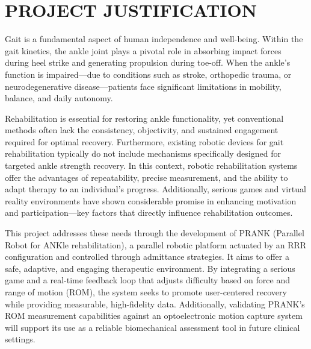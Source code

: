 \chapter{PROJECT JUSTIFICATION} \label{results}
\graphicspath{{images/}}

Gait is a fundamental aspect of human independence and well-being. Within the gait kinetics, the ankle joint plays a pivotal role in absorbing impact forces during heel strike and generating propulsion during toe-off. When the ankle's function is impaired—due to conditions such as stroke, orthopedic trauma, or neurodegenerative disease—patients face significant limitations in mobility, balance, and daily autonomy.

Rehabilitation is essential for restoring ankle functionality, yet conventional methods often lack the consistency, objectivity, and sustained engagement required for optimal recovery. Furthermore, existing robotic devices for gait rehabilitation typically do not include mechanisms specifically designed for targeted ankle strength recovery. In this context, robotic rehabilitation systems offer the advantages of repeatability, precise measurement, and the ability to adapt therapy to an individual’s progress. Additionally, serious games and virtual reality environments have shown considerable promise in enhancing motivation and participation—key factors that directly influence rehabilitation outcomes.

This project addresses these needs through the development of PRANK (Parallel Robot for ANKle rehabilitation), a parallel robotic platform actuated by an RRR configuration and controlled through admittance strategies. It aims to offer a safe, adaptive, and engaging therapeutic environment. By integrating a serious game and a real-time feedback loop that adjusts difficulty based on force and range of motion (ROM), the system seeks to promote user-centered recovery while providing measurable, high-fidelity data. Additionally, validating PRANK’s ROM measurement capabilities against an optoelectronic motion capture system will support its use as a reliable biomechanical assessment tool in future clinical settings.